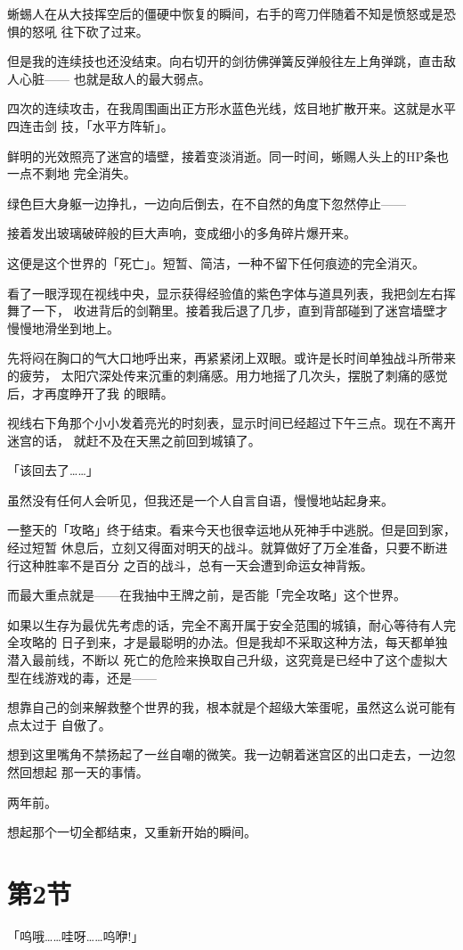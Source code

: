 \documentclass[11pt]{book}
\begin{document}
蜥蜴人在从大技挥空后的僵硬中恢复的瞬间，右手的弯刀伴随着不知是愤怒或是恐惧的怒吼
往下砍了过来。

但是我的连续技也还没结束。向右切开的剑彷佛弹簧反弹般往左上角弹跳，直击敌人心脏——
也就是敌人的最大弱点。

四次的连续攻击，在我周围画出正方形水蓝色光线，炫目地扩散开来。这就是水平四连击剑
技，「水平方阵斩」。

鲜明的光效照亮了迷宫的墙壁，接着变淡消逝。同一时间，蜥赐人头上的HP条也一点不剩地
完全消失。

绿色巨大身躯一边挣扎，一边向后倒去，在不自然的角度下忽然停止——

接着发出玻璃破碎般的巨大声响，变成细小的多角碎片爆开来。

这便是这个世界的「死亡」。短暂、简洁，一种不留下任何痕迹的完全消灭。

看了一眼浮现在视线中央，显示获得经验值的紫色字体与道具列表，我把剑左右挥舞了一下，
收进背后的剑鞘里。接着我后退了几步，直到背部碰到了迷宫墙壁才慢慢地滑坐到地上。

先将闷在胸口的气大口地呼出来，再紧紧闭上双眼。或许是长时间单独战斗所带来的疲劳，
太阳穴深处传来沉重的刺痛感。用力地摇了几次头，摆脱了刺痛的感觉后，才再度睁开了我
的眼睛。

视线右下角那个小小发着亮光的时刻表，显示时间已经超过下午三点。现在不离开迷宫的话，
就赶不及在天黑之前回到城镇了。

「该回去了……」

虽然没有任何人会听见，但我还是一个人自言自语，慢慢地站起身来。

一整天的「攻略」终于结束。看来今天也很幸运地从死神手中逃脱。但是回到家，经过短暂
休息后，立刻又得面对明天的战斗。就算做好了万全准备，只要不断进行这种胜率不是百分
之百的战斗，总有一天会遭到命运女神背叛。

而最大重点就是——在我抽中王牌之前，是否能「完全攻略」这个世界。

如果以生存为最优先考虑的话，完全不离开属于安全范围的城镇，耐心等待有人完全攻略的
日子到来，才是最聪明的办法。但是我却不采取这种方法，每天都单独潜入最前线，不断以
死亡的危险来换取自己升级，这究竟是已经中了这个虚拟大型在线游戏的毒，还是——

想靠自己的剑来解救整个世界的我，根本就是个超级大笨蛋呢，虽然这么说可能有点太过于
自傲了。

想到这里嘴角不禁扬起了一丝自嘲的微笑。我一边朝着迷宫区的出口走去，一边忽然回想起
那一天的事情。

两年前。

想起那个一切全都结束，又重新开始的瞬间。
\section{第2节}
\label{sec:orge8f1325}
「呜哦……哇呀……呜咿!」
\end{document}
